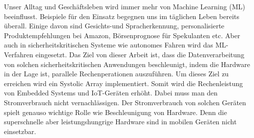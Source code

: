 Unser Alltag und Geschäftsleben wird immer mehr von Machine Learning (ML) beeinflusst. Beispiele für den Einsatz begegnen uns im täglichen Leben bereits überall. Einige davon sind Gesichts-und Spracherkennung, personalisierte Produktempfehlungen bei Amazon, Börsenprognose für Spekulanten etc. Aber auch in sicherheitskritischen Systeme wie autonomes Fahren wird das ML-Verfahren eingesetzt. Das Ziel von dieser Arbeit ist, dass die Datenverarbeitung von solchen sicherheitskritischen Anwendungen beschleunigt, indem die Hardware in der Lage ist, parallele Rechenperationen auszuführen. Um dieses Ziel zu erreichen wird ein Systolic Array implementiert. Somit wird die Rechenleistung von Embedded Systems und IoT-Geräten erhöht. Dabei muss man den Stromverbrauch nicht vernachlässigen. Der Stromverbrauch von solchen Geräten spielt genauso wichtige Rolle wie Beschleunigung von Hardware. Denn die superschnelle  aber leistungshungrige Hardware sind in mobilen Geräten nicht einsetzbar.  



%
